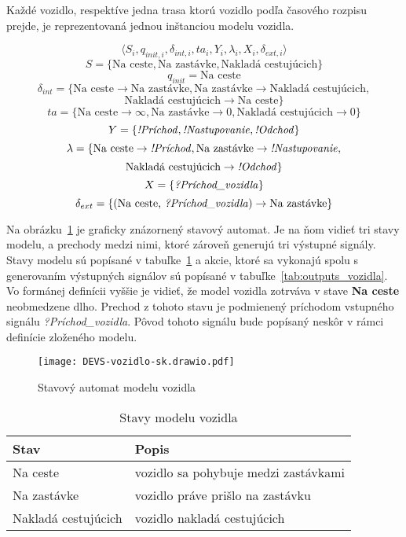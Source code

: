 Každé vozidlo, respektíve jedna trasa ktorú vozidlo podľa časového rozpisu prejde, je reprezentovaná jednou inštanciou modelu vozidla.

\[\langle S_i, q_{init,i}, {\delta}_{int,i}, ta_i, Y_i, {\lambda}_i, X_i, {\delta}_{ext,i} \rangle\]
\[S = \{\text{Na ceste}, \text{Na zastávke}, \text{Nakladá cestujúcich} \}\]
\[q_{init} = \text{Na ceste}\]
\[\delta_{int} = \{ \text{Na ceste} \rightarrow \text{Na zastávke}, \text{Na zastávke} \rightarrow \text{Nakladá cestujúcich},\]
\[\text{Nakladá cestujúcich} \rightarrow \text{Na ceste} \}\]
\[ta = \{ \text{Na ceste} \rightarrow \infty, \text{Na zastávke} \rightarrow 0, \text{Nakladá cestujúcich} \rightarrow 0 \}\]
\[Y = \{\text{\textit{!Príchod}}, \text{\textit{!Nastupovanie}}, \text{\textit{!Odchod}} \}\]
\[\lambda = \{ \text{Na ceste} \rightarrow \text{\textit{!Príchod}}, \text{Na zastávke} \rightarrow \text{\textit{!Nastupovanie}},\]
\[\text{Nakladá cestujúcich} \rightarrow \text{\textit{!Odchod}} \}\]
\[X = \{ \text{\textit{?Príchod\_vozidla}} \}\]
\[\delta_{ext} = \{ (\text{Na ceste, \textit{?Príchod\_vozidla}}) \rightarrow \text{Na zastávke} \}\]

Na obrázku~\ref{fig:model_vozidla} je graficky znázornený stavový automat.
Je na ňom vidieť tri stavy modelu, a prechody medzi nimi, ktoré zároveň generujú tri výstupné signály.
Stavy modelu sú popísané v tabuľke~\ref{tab:stavy_vozidla} a akcie, ktoré sa vykonajú spolu s generovaním výstupných signálov sú popísané v tabuľke~\ref{tab:outputs_vozidla}.
Vo formánej definícii vyššie je vidieť, že model vozidla zotrváva v stave \textbf{Na ceste} neobmedzene dlho.
Prechod z tohoto stavu je podmienený príchodom vstupného signálu \textit{?Príchod\_vozidla}.
Pôvod tohoto signálu bude popísaný neskôr v rámci definície zloženého modelu.

\begin{figure}[h]\label{fig:model_vozidla}
  \centering
  \texttt{[image: DEVS-vozidlo-sk.drawio.pdf]}
  \caption{Stavový automat modelu vozidla}
\end{figure}

\begin{table}[h]\label{tab:stavy_vozidla}
  \centering
  \begin{tabularx}{\textwidth}{|l|X|}
    \hline
    \textbf{Stav} & \textbf{Popis} \\ \hline
    Na ceste & vozidlo sa pohybuje medzi zastávkami \\ \hline
    Na zastávke & vozidlo práve prišlo na zastávku \\ \hline
    Nakladá cestujúcich & vozidlo nakladá cestujúcich \\ \hline
  \end{tabularx}
  \caption{Stavy modelu vozidla}
\end{table}

